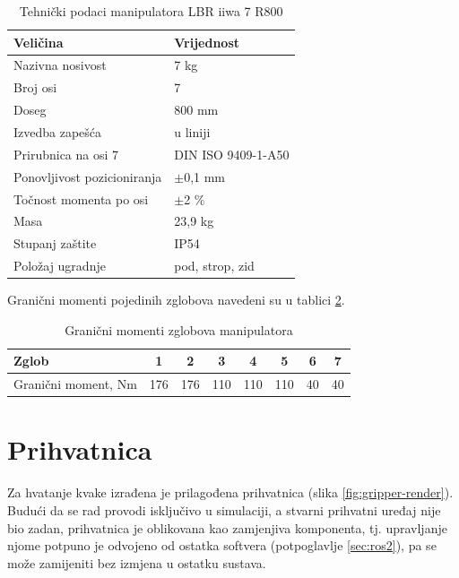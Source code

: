 \begin{table}[H]
    \centering
    \caption{Tehnički podaci manipulatora LBR iiwa 7 R800}
    \label{tab:lbr}
    \begin{tabular}{@{}ll@{}}
        \toprule
        Veličina                    & Vrijednost         \\
        \midrule
        Nazivna nosivost            & 7 kg               \\
        Broj osi                    & 7                  \\
        Doseg                       & 800 mm             \\
        Izvedba zapešća             & u liniji           \\
        Prirubnica na osi 7         & DIN ISO 9409-1-A50 \\
        Ponovljivost pozicioniranja & $\pm$0,1 mm        \\
        Točnost momenta po osi      & $\pm$2 \%          \\
        Masa                        & 23,9 kg            \\
        Stupanj zaštite             & IP54               \\
        Položaj ugradnje            & pod, strop, zid    \\
        \bottomrule
    \end{tabular}
\end{table}

Granični momenti pojedinih zglobova navedeni su u tablici \ref{tab:momenti}.

\begin{table}[H]
    \centering
    \caption{Granični momenti zglobova manipulatora}
    \label{tab:momenti}
    \begin{tabular}{@{}lccccccc@{}}
        \toprule
        Zglob               & 1   & 2   & 3   & 4   & 5   & 6  & 7  \\
        \midrule
        Granični moment, Nm & 176 & 176 & 110 & 110 & 110 & 40 & 40 \\
        \bottomrule
    \end{tabular}
\end{table}

\section{Prihvatnica}
\label{sec:gripper}

Za hvatanje kvake izrađena je prilagođena prihvatnica (slika \ref{fig:gripper-render}). Budući da se rad provodi isključivo u
simulaciji, a stvarni prihvatni uređaj nije bio zadan, prihvatnica je oblikovana kao
zamjenjiva komponenta, tj. upravljanje njome potpuno je odvojeno od ostatka softvera
(potpoglavlje \ref{sec:ros2}), pa se može zamijeniti bez izmjena u ostatku sustava.

